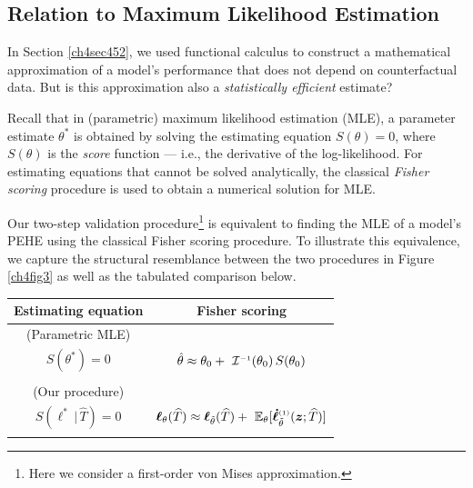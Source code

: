 \documentclass [PhD] {uclathes}
\begin{document}
\subsection{Relation to Maximum Likelihood Estimation} 
\label{Sec33}
In Section \ref{ch4sec452}, we used functional calculus to construct a mathematical approximation of a model's performance that does not depend on counterfactual data. But is this approximation also a {\it statistically efficient} estimate?

Recall that in (parametric) maximum likelihood estimation (MLE), a parameter estimate \mbox{\footnotesize $\theta^*$} is obtained by solving the estimating equation \mbox{\footnotesize $S(\theta) = 0$}, where \mbox{\footnotesize $S(\theta)$} is the {\it score} function --- i.e., the derivative of the log-likelihood. For estimating equations that cannot be solved analytically, the classical {\it Fisher scoring} procedure \cite{longford1987fast} is used to obtain a numerical solution for MLE. 

Our two-step validation procedure\footnote{Here we consider a first-order von Mises approximation.} is equivalent to finding the MLE of a model's PEHE using the classical Fisher scoring procedure. To illustrate this equivalence, we capture the structural resemblance between the two procedures in Figure \ref{ch4fig3} as well as the tabulated comparison below. %

\begin{center}
\begin{tabular}{ |c|c| } 
\hline
{\bf Estimating equation} & {\bf Fisher scoring} \\
\hline
(Parametric MLE) & \\
$S(\theta^*) = 0$ & $\hat{\theta} \approx \theta_0 + \,\,\mathcal{I}^{\mbox{\tiny $-1$}}(\theta_0)\,S(\theta_0)$ \\ 
& \\ \hline %
(Our procedure) & \\
$S(\boldsymbol{\ell}^*\,|\,\widehat{T}) = 0$ & $\boldsymbol{\ell}_{\theta}(\widehat{T}) \approx \boldsymbol{\ell}_{\tilde{\theta}}(\widehat{T}) + \,\,\mathbb{E}_{\theta}[\boldsymbol{\dot{\ell}}^{\mbox{\tiny $(1)$}}_{\tilde{\theta}}(\boldsymbol{z};\widehat{T})]$ \\ 
& \\ %
\hline
\end{tabular}
\end{center}  
\end{document}
